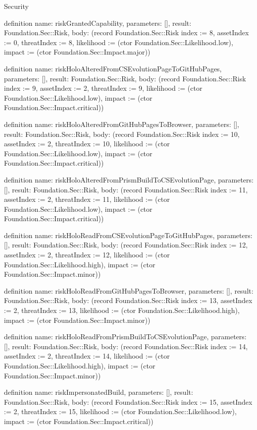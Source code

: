 \begin{lexlean}{Security}
\begin{semanticmodule}
definition{
  name: riskGrantedCapability,
  parameters: [],
  result: Foundation.Sec::Risk,
  body: (record Foundation.Sec::Risk {index := 8, assetIndex := 0, threatIndex := 8, likelihood := (ctor Foundation.Sec::Likelihood.low), impact := (ctor Foundation.Sec::Impact.major)})
}

definition{
  name: riskHoloAlteredFromCSEvolutionPageToGitHubPages,
  parameters: [],
  result: Foundation.Sec::Risk,
  body: (record Foundation.Sec::Risk {index := 9, assetIndex := 2, threatIndex := 9, likelihood := (ctor Foundation.Sec::Likelihood.low), impact := (ctor Foundation.Sec::Impact.critical)})
}

definition{
  name: riskHoloAlteredFromGitHubPagesToBrowser,
  parameters: [],
  result: Foundation.Sec::Risk,
  body: (record Foundation.Sec::Risk {index := 10, assetIndex := 2, threatIndex := 10, likelihood := (ctor Foundation.Sec::Likelihood.low), impact := (ctor Foundation.Sec::Impact.critical)})
}

definition{
  name: riskHoloAlteredFromPrismBuildToCSEvolutionPage,
  parameters: [],
  result: Foundation.Sec::Risk,
  body: (record Foundation.Sec::Risk {index := 11, assetIndex := 2, threatIndex := 11, likelihood := (ctor Foundation.Sec::Likelihood.low), impact := (ctor Foundation.Sec::Impact.critical)})
}

definition{
  name: riskHoloReadFromCSEvolutionPageToGitHubPages,
  parameters: [],
  result: Foundation.Sec::Risk,
  body: (record Foundation.Sec::Risk {index := 12, assetIndex := 2, threatIndex := 12, likelihood := (ctor Foundation.Sec::Likelihood.high), impact := (ctor Foundation.Sec::Impact.minor)})
}

definition{
  name: riskHoloReadFromGitHubPagesToBrowser,
  parameters: [],
  result: Foundation.Sec::Risk,
  body: (record Foundation.Sec::Risk {index := 13, assetIndex := 2, threatIndex := 13, likelihood := (ctor Foundation.Sec::Likelihood.high), impact := (ctor Foundation.Sec::Impact.minor)})
}

definition{
  name: riskHoloReadFromPrismBuildToCSEvolutionPage,
  parameters: [],
  result: Foundation.Sec::Risk,
  body: (record Foundation.Sec::Risk {index := 14, assetIndex := 2, threatIndex := 14, likelihood := (ctor Foundation.Sec::Likelihood.high), impact := (ctor Foundation.Sec::Impact.minor)})
}

definition{
  name: riskImpersonatedBuild,
  parameters: [],
  result: Foundation.Sec::Risk,
  body: (record Foundation.Sec::Risk {index := 15, assetIndex := 2, threatIndex := 15, likelihood := (ctor Foundation.Sec::Likelihood.low), impact := (ctor Foundation.Sec::Impact.critical)})
}


\end{semanticmodule}
\end{lexlean}
